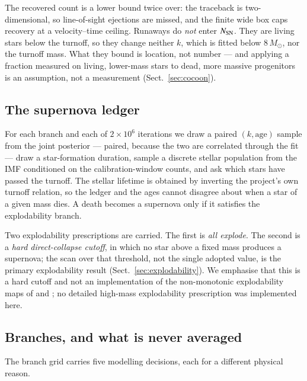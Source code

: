 \documentclass{aa}
\begin{document}
The recovered count is a lower bound twice over: the traceback is
two-dimensional, so line-of-sight ejections are missed, and the finite wide box
caps recovery at a velocity--time ceiling. Runaways do \emph{not} enter
$N_{\rm SN}$. They are living stars below the turnoff, so they change neither
$k$, which is fitted below 8\,$M_\odot$, nor the turnoff mass. What they bound is
location, not number --- and applying a fraction measured on living, lower-mass
stars to dead, more massive progenitors is an assumption, not a measurement
(Sect.~\ref{sec:cocoon}).

\subsection{The supernova ledger}\label{sec:ledger}

For each branch and each of $2\times10^{6}$ iterations we draw a paired
$(k, \mathrm{age})$ sample from the joint posterior --- paired, because the two
are correlated through the fit --- draw a star-formation duration, sample a
discrete stellar population from the IMF conditioned on the calibration-window
counts, and ask which stars have passed the turnoff. The stellar lifetime is
obtained by inverting the project's own turnoff relation, so the ledger and the
ages cannot disagree about when a star of a given mass dies. A death becomes a
supernova only if it satisfies the explodability branch.

Two explodability prescriptions are carried. The first is \emph{all explode}.
The second is a \emph{hard direct-collapse cutoff}, in which no star above a
fixed mass produces a supernova; the scan over that threshold, not the single
adopted value, is the primary explodability result
(Sect.~\ref{sec:explodability}). We emphasise that this is a hard cutoff and not
an implementation of the non-monotonic explodability maps of
\citet{sukhbold2016} and \citet{ertl2016}; no detailed high-mass explodability
prescription was implemented here.

\subsection{Branches, and what is never averaged}\label{sec:branches}

The branch grid carries five modelling decisions, each for a different physical
reason.
\end{document}
